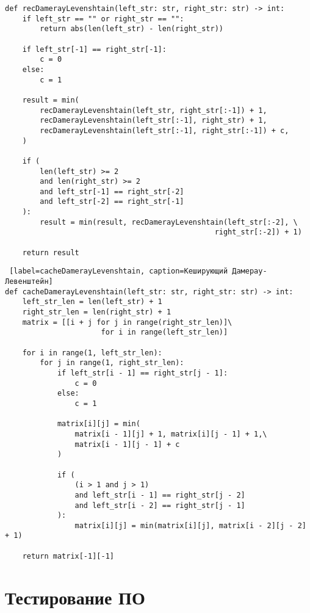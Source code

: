 \captionsetup{singlelinecheck = false, justification=raggedright}
\begin{lstlisting}[label=recDamerayLevenshtain, caption=Рекурсивный Дамерау-Левенштейн]
def recDamerayLevenshtain(left_str: str, right_str: str) -> int:
    if left_str == "" or right_str == "":
        return abs(len(left_str) - len(right_str))
        
    if left_str[-1] == right_str[-1]:
        c = 0
    else:
        c = 1

    result = min(
        recDamerayLevenshtain(left_str, right_str[:-1]) + 1,
        recDamerayLevenshtain(left_str[:-1], right_str) + 1,
        recDamerayLevenshtain(left_str[:-1], right_str[:-1]) + c,
    )

    if (
        len(left_str) >= 2
        and len(right_str) >= 2
        and left_str[-1] == right_str[-2]
        and left_str[-2] == right_str[-1]
    ):
        result = min(result, recDamerayLevenshtain(left_str[:-2], \
                                                right_str[:-2]) + 1)

    return result
\end{lstlisting}

\captionsetup{singlelinecheck = false, justification=raggedright}
\begin{lstlisting} [label=cacheDamerayLevenshtain, caption=Кеширующий Дамерау-Левенштейн]
def cacheDamerayLevenshtain(left_str: str, right_str: str) -> int:
    left_str_len = len(left_str) + 1
    right_str_len = len(right_str) + 1
    matrix = [[i + j for j in range(right_str_len)]\
                      for i in range(left_str_len)]

    for i in range(1, left_str_len):
        for j in range(1, right_str_len):
            if left_str[i - 1] == right_str[j - 1]:
                c = 0
            else:
                c = 1

            matrix[i][j] = min(
                matrix[i - 1][j] + 1, matrix[i][j - 1] + 1,\
                matrix[i - 1][j - 1] + c
            )

            if (
                (i > 1 and j > 1)
                and left_str[i - 1] == right_str[j - 2]
                and left_str[i - 2] == right_str[j - 1]
            ):
                matrix[i][j] = min(matrix[i][j], matrix[i - 2][j - 2] + 1)

    return matrix[-1][-1]
\end{lstlisting}

\section{Тестирование ПО}

